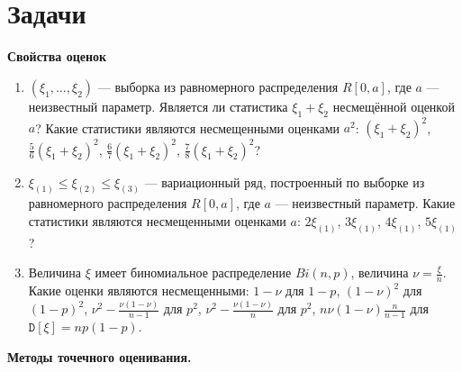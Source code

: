 \documentclass[a4paper,12pt]{article}
\newcommand{\variance}[1]{\mathtt{D} \left[ #1 \right]}
\newcommand{\sample}[2]{\left( #1_1, \dots, #1_{#2} \right)}
\newcommand{\theme}[1]{\hfil \textbf{#1} \hfil}
\begin{document}
    \section{Задачи}

    \theme{Свойства оценок}

    \begin{enumerate}[topsep=1cm, parsep=1cm]
        \item $\sample{\xi}{2}$ --- выборка из равномерного распределения $R [0, a]$, где $a$ --- неизвестный параметр. Является ли статистика
              $\xi_1 + \xi_2$ несмещённой оценкой $a$? Какие статистики являются несмещенными оценками $a^2$: $(\xi_1 + \xi_2)^2$,
              $\frac{5}{6}(\xi_1 + \xi_2)^2$, $\frac{6}{7}(\xi_1 + \xi_2)^2$, $\frac{7}{8}(\xi_1 + \xi_2)^2$?

        \item $\xi_{(1)} \le \xi_{(2)} \le \xi_{(3)}$ --- вариационный ряд, построенный по выборке из равномерного распределения $R[0, a]$, где
              $a$ --- неизвестный параметр. Какие статистики являются несмещенными оценками $a$: $2 \xi_{(1)}$, $3 \xi_{(1)}$, $4 \xi_{(1)}$, $5 \xi_{(1)}$?

        \item Величина $\xi$ имеет биномиальное распределение $Bi(n,p)$, величина $\nu = \frac{\xi}{n}$. Какие оценки являются несмещенными:
              $1 - \nu$ для $1-p$, $\left( 1 - \nu \right)^2$ для $(1-p)^2$, $\nu^2 - \frac{\nu(1-\nu)}{n-1}$ для $p^2$, $\nu^2 - \frac{\nu(1-\nu)}{n}$ для $p^2$,
              $n \nu (1-\nu) \frac{n}{n-1}$ для $\variance{\xi} = np(1-p)$.
    \end{enumerate}

    \theme{Методы точечного оценивания.}
\end{document}
